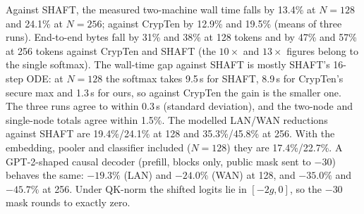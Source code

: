 \documentclass[11pt]{article}
\begin{document}
Against SHAFT, the measured two-machine wall time falls by 13.4\% at $N{=}128$ and 24.1\% at
$N{=}256$; against CrypTen by 12.9\% and 19.5\% (means of three runs). End-to-end bytes fall by 31\% and 38\% at 128 tokens and by 47\% and 57\%
at 256 tokens against CrypTen and SHAFT (the $10\times$ and $13\times$ figures belong to the single softmax).
The wall-time gap against SHAFT is mostly SHAFT's 16-step ODE: at $N{=}128$ the softmax takes 9.5\,s for SHAFT,
8.9\,s for CrypTen's secure max and 1.3\,s for ours, so against CrypTen the gain is the smaller one. The three runs agree to within 0.3\,s (standard deviation), and the two-node and single-node totals agree within 1.5\%. The modelled LAN/WAN reductions against SHAFT are
19.4\%/24.1\% at 128 and 35.3\%/45.8\% at 256. With the embedding, pooler and classifier included
($N{=}128$) they are 17.4\%/22.7\%. A GPT-2-shaped causal decoder (prefill, blocks only, public
mask sent to $-30$) behaves the same: $-19.3\%$ (LAN) and $-24.0\%$ (WAN) at 128, and $-35.0\%$ and $-45.7\%$ at 256.
Under QK-norm the shifted logits lie in $[-2g,0]$, so the $-30$ mask rounds to exactly zero.
\end{document}
